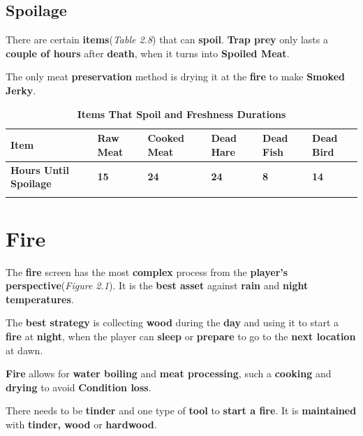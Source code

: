 		\subsection{Spoilage}
			\par There are certain \textbf{items}(\textit{Table 2.8}) that can \textbf{spoil}. \textbf{Trap prey} only lasts a \textbf{couple of hours} after \textbf{death}, when it turns into \textbf{Spoiled Meat}. 
			\par The only meat \textbf{preservation} method is drying it at the \textbf{fire} to make \textbf{Smoked Jerky}.

			\begin{longtable}{|C{10.555em}|C{4.0em}|C{4.0em}|C{4.0em}|C{4.0em}|C{4.0em}|}
			    \toprule
			     \textcolor[rgb]{ 1,  1,  1}{\textbf{Item}} &\textbf{Raw Meat} &\textbf{Cooked Meat} & \textbf{Dead Hare} & \textbf{Dead Fish} & \textbf{Dead Bird} \\
			    \midrule
			     \textcolor[rgb]{ 1,  1,  1}{\textbf{Hours Until Spoilage}} & \textbf{15} & \textbf{24} & \textbf{24} & \textbf{8} & \textbf{14} \\
			    \bottomrule	
			\caption{\textbf{\textbf{Items} That \textbf{Spoil} and \textbf{Freshness Durations}}}
			\end{longtable}


	\section{Fire}
		\par The \textbf{fire} screen has the most \textbf{complex} process from the \textbf{player's perspective}(\textit{Figure 2.1}). It is the \textbf{best asset} against \textbf{rain} and \textbf{night temperatures}.
		\par The \textbf{best strategy} is collecting \textbf{wood} during the \textbf{day} and using it to start a \textbf{fire} at \textbf{night}, when the player can \textbf{sleep} or \textbf{prepare} to go to the \textbf{next location} at dawn. 
		\par \textbf{Fire} allows for \textbf{water boiling} and \textbf{meat processing}, such a \textbf{cooking} and \textbf{drying} to avoid \textbf{Condition loss}.
		\par There needs to be \textbf{tinder} and one type of \textbf{tool} to \textbf{start a fire}. It is \textbf{maintained} with \textbf{tinder, wood} or \textbf{hardwood}. 

